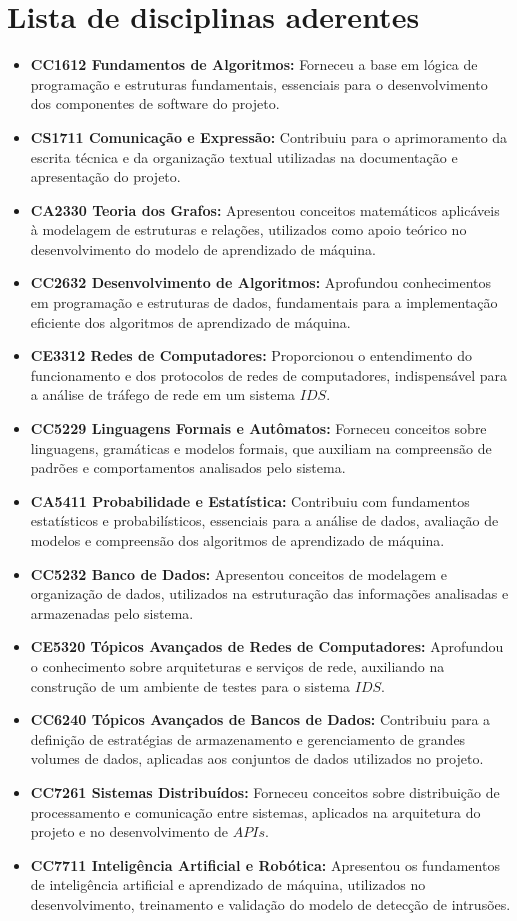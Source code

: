 \documentclass[11pt,a4,oneside]{article}
\begin{document}
\section*{Lista de disciplinas aderentes}
\begin{itemize}
	\item \textbf{CC1612 Fundamentos de Algoritmos: }Forneceu a base em lógica de programação e estruturas fundamentais, essenciais para o desenvolvimento dos componentes de software do projeto.
	\item \textbf{CS1711 Comunicação e Expressão: }Contribuiu para o aprimoramento da escrita técnica e da organização textual utilizadas na documentação e apresentação do projeto.
	\item \textbf{CA2330 Teoria dos Grafos: }Apresentou conceitos matemáticos aplicáveis à modelagem de estruturas e relações, utilizados como apoio teórico no desenvolvimento do modelo de aprendizado de máquina.
	\item \textbf{CC2632 Desenvolvimento de Algoritmos: }Aprofundou conhecimentos em programação e estruturas de dados, fundamentais para a implementação eficiente dos algoritmos de aprendizado de máquina.
	\item \textbf{CE3312 Redes de Computadores: }Proporcionou o entendimento do funcionamento e dos protocolos de redes de computadores, indispensável para a análise de tráfego de rede em um sistema $IDS$.
	\item \textbf{CC5229 Linguagens Formais e Autômatos: }Forneceu conceitos sobre linguagens, gramáticas e modelos formais, que auxiliam na compreensão de padrões e comportamentos analisados pelo sistema.
	\item \textbf{CA5411 Probabilidade e Estatística: }Contribuiu com fundamentos estatísticos e probabilísticos, essenciais para a análise de dados, avaliação de modelos e compreensão dos algoritmos de aprendizado de máquina.
	\item \textbf{CC5232 Banco de Dados: }Apresentou conceitos de modelagem e organização de dados, utilizados na estruturação das informações analisadas e armazenadas pelo sistema.
	\item \textbf{CE5320 Tópicos Avançados de Redes de Computadores: }Aprofundou o conhecimento sobre arquiteturas e serviços de rede, auxiliando na construção de um ambiente de testes para o sistema $IDS$.
	\item \textbf{CC6240 Tópicos Avançados de Bancos de Dados: }Contribuiu para a definição de estratégias de armazenamento e gerenciamento de grandes volumes de dados, aplicadas aos conjuntos de dados utilizados no projeto.
	\item \textbf{CC7261 Sistemas Distribuídos: }Forneceu conceitos sobre distribuição de processamento e comunicação entre sistemas, aplicados na arquitetura do projeto e no desenvolvimento de $APIs$.
	\item \textbf{CC7711 Inteligência Artificial e Robótica: }Apresentou os fundamentos de inteligência artificial e aprendizado de máquina, utilizados no desenvolvimento, treinamento e validação do modelo de detecção de intrusões.
\end{itemize}
\end{document}

